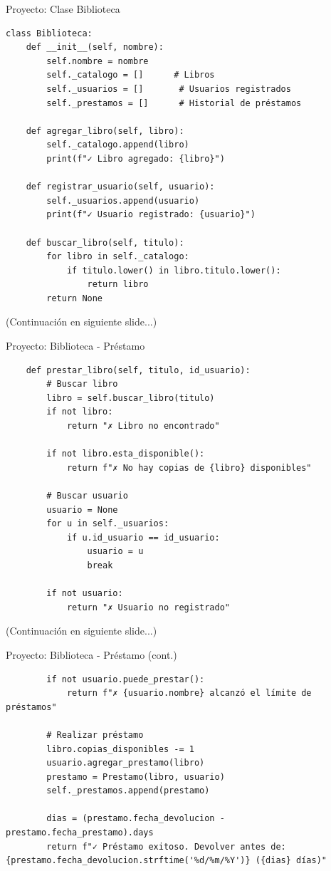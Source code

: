 \documentclass{beamer}
\begin{document}
\begin{frame}[fragile]{Proyecto: Clase Biblioteca \faBuilding}
\begin{lstlisting}
class Biblioteca:
    def __init__(self, nombre):
        self.nombre = nombre
        self._catalogo = []      # Libros
        self._usuarios = []       # Usuarios registrados
        self._prestamos = []      # Historial de préstamos
    
    def agregar_libro(self, libro):
        self._catalogo.append(libro)
        print(f"✓ Libro agregado: {libro}")
    
    def registrar_usuario(self, usuario):
        self._usuarios.append(usuario)
        print(f"✓ Usuario registrado: {usuario}")
    
    def buscar_libro(self, titulo):
        for libro in self._catalogo:
            if titulo.lower() in libro.titulo.lower():
                return libro
        return None
\end{lstlisting}

\small(Continuación en siguiente slide...)
\end{frame}

\begin{frame}[fragile]{Proyecto: Biblioteca - Préstamo \faHandHoldingHeart}
\begin{lstlisting}
    def prestar_libro(self, titulo, id_usuario):
        # Buscar libro
        libro = self.buscar_libro(titulo)
        if not libro:
            return "✗ Libro no encontrado"
        
        if not libro.esta_disponible():
            return f"✗ No hay copias de {libro} disponibles"
        
        # Buscar usuario
        usuario = None
        for u in self._usuarios:
            if u.id_usuario == id_usuario:
                usuario = u
                break
        
        if not usuario:
            return "✗ Usuario no registrado"
\end{lstlisting}

\small(Continuación en siguiente slide...)
\end{frame}

\begin{frame}[fragile]{Proyecto: Biblioteca - Préstamo (cont.) \faBook}
\begin{lstlisting}
        if not usuario.puede_prestar():
            return f"✗ {usuario.nombre} alcanzó el límite de préstamos"
        
        # Realizar préstamo
        libro.copias_disponibles -= 1
        usuario.agregar_prestamo(libro)
        prestamo = Prestamo(libro, usuario)
        self._prestamos.append(prestamo)
        
        dias = (prestamo.fecha_devolucion - prestamo.fecha_prestamo).days
        return f"✓ Préstamo exitoso. Devolver antes de: {prestamo.fecha_devolucion.strftime('%d/%m/%Y')} ({dias} días)"
\end{lstlisting}
\end{frame}
\end{document}
